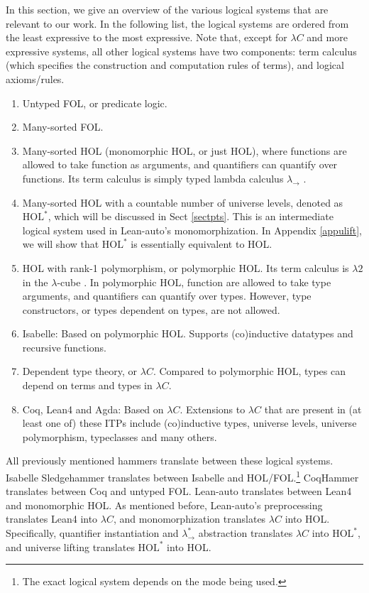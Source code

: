   In this section, we give an overview of the various logical systems
  that are relevant to our work. In the following list, the logical systems
  are ordered from the least expressive to the most expressive. Note that, except
  for $\lambda C$ and more expressive systems, all other logical systems have
  two components: term calculus (which specifies the construction and computation
  rules of terms), and logical axioms/rules.
  \begin{enumerate}
    \item Untyped FOL, or predicate logic.
    \item Many-sorted FOL.
    \item Many-sorted HOL (monomorphic HOL, or just HOL), where functions are allowed
      to take function as arguments, and quantifiers can quantify over functions.
      Its term calculus is simply typed lambda calculus $\lambda_\to$ \cite{LambdaWithType}.
    \item Many-sorted HOL with a countable number of universe levels, denoted as $\text{HOL}^*$,
      which will be discussed in Sect \ref{sectpts}. This is an
      intermediate logical system used in Lean-auto's monomorphization. In Appendix \ref{appulift}, we
      will show that $\text{HOL}^*$ is essentially equivalent to HOL.
    \item HOL with rank-1 polymorphism, or polymorphic HOL. Its term calculus is
      $\lambda 2$ in the $\lambda$-cube \cite{LambdaWithType}. In polymorphic HOL, function are
      allowed to take type arguments, and quantifiers can quantify over types. However, type
      constructors, or types dependent on types, are not allowed.
    \item Isabelle: Based on polymorphic HOL. Supports (co)inductive datatypes and recursive functions.
    \item Dependent type theory, or $\lambda C$. Compared to polymorphic HOL, types can depend on terms and types in $\lambda C$.
    \item Coq, Lean4 and Agda: Based on $\lambda C$. Extensions to $\lambda C$ that are
      present in (at least one of) these ITPs include (co)inductive types, universe levels,
      universe polymorphism, typeclasses and many others.
  \end{enumerate}
  
  \noindent All previously mentioned hammers translate between these logical systems. Isabelle
  Sledgehammer translates between Isabelle and
  HOL/FOL.\footnote{The exact logical system depends on the mode being used.}
  CoqHammer translates between Coq and untyped FOL. Lean-auto translates
  between Lean4 and monomorphic HOL. As mentioned before, Lean-auto's
  preprocessing translates Lean4 into $\lambda C$, and monomorphization
  translates $\lambda C$ into HOL. Specifically, quantifier instantiation
  and $\lambda_\to^*$ abstraction translates $\lambda C$ into $\text{HOL}^*$,
  and universe lifting translates $\text{HOL}^*$ into HOL.

